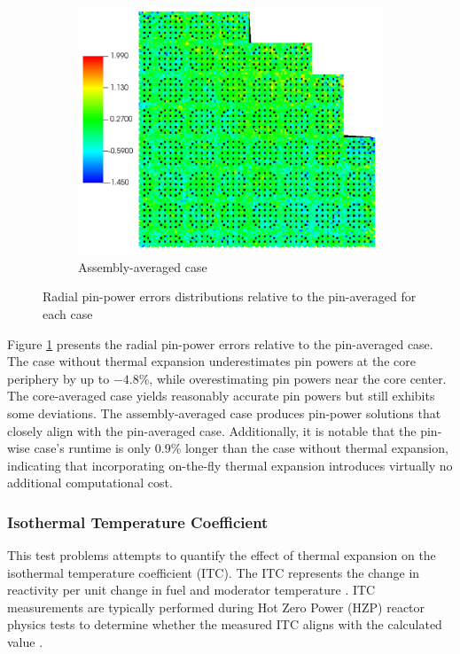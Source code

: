 \begin{figure}
\begin{subfigure}[b]{0.5\textwidth}
        \centering
        \includegraphics[width=\textwidth]{figs/pin_error_assembly.pdf}
        \caption{Assembly-averaged case}
    \end{subfigure}
    \caption[Radial pin-power errors distributions relative to the pin-averaged case]{Radial pin-power errors distributions relative to the pin-averaged for each case}
    \label{fig_421}
\end{figure}

Figure \ref{fig_421} presents the radial pin-power errors relative to the pin-averaged case. The case without thermal expansion underestimates pin powers at the core periphery by up to $-4.8$\%, while overestimating pin powers near the core center. The core-averaged case yields reasonably accurate pin powers but still exhibits some deviations. The assembly-averaged case produces pin-power solutions that closely align with the pin-averaged case. Additionally, it is notable that the pin-wise case's runtime is only 0.9\% longer than the case without thermal expansion, indicating that incorporating on-the-fly thermal expansion introduces virtually no additional computational cost.

\subsubsection{Isothermal Temperature Coefficient}

This test problems attempts to quantify the effect of thermal expansion on the isothermal temperature coefficient (ITC). The ITC represents the change in reactivity per unit change in fuel and moderator temperature \cite{ansi}. ITC measurements are typically performed during Hot Zero Power (HZP) reactor physics tests to determine whether the measured ITC aligns with the calculated value \cite{hong}.

